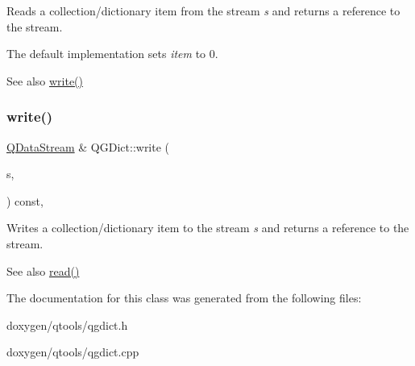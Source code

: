 Reads a collection/dictionary item from the stream {\itshape s} and returns a reference to the stream.

The default implementation sets {\itshape item} to 0.

\begin{DoxySeeAlso}{See also}
\mbox{\hyperlink{structcmd_8h_af2a3ea719b83f672637febdd87c36c36}{write()}} 
\end{DoxySeeAlso}
\mbox{\label{class_q_g_dict_a0d6ba72de05ffbd4b935316cb901287e}} 
\subsubsection{\texorpdfstring{write()}{write()}}
{\footnotesize\ttfamily \mbox{\hyperlink{class_q_data_stream}{Q\+Data\+Stream}} \& Q\+G\+Dict\+::write (\begin{DoxyParamCaption}\item[{\mbox{\hyperlink{class_q_data_stream}{Q\+Data\+Stream}} \&}]{s,  }\item[{Q\+Collection\+::\+Item}]{ }\end{DoxyParamCaption}) const\hspace{0.3cm}{\ttfamily [protected]}, {\ttfamily [virtual]}}

Writes a collection/dictionary item to the stream {\itshape s} and returns a reference to the stream.

\begin{DoxySeeAlso}{See also}
\mbox{\hyperlink{structcmd_8h_a9c7b76d5266903891c803132d51ccb90}{read()}} 
\end{DoxySeeAlso}


The documentation for this class was generated from the following files\+:\begin{DoxyCompactItemize}
\item 
doxygen/qtools/qgdict.\+h\item 
doxygen/qtools/qgdict.\+cpp\end{DoxyCompactItemize}

